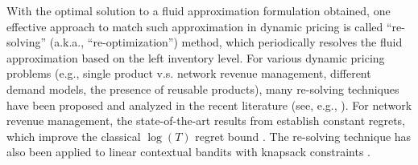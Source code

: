 \documentclass[opre]{informs3aa}
\begin{document}



With the optimal solution to a fluid approximation formulation obtained,
one effective approach to match such approximation in dynamic pricing is called ``re-solving'' (a.k.a., ``re-optimization'') method, which periodically resolves the fluid approximation based on the left inventory level. For various dynamic pricing problems (e.g., single product v.s. network revenue management, different demand models, the presence of reusable products), many re-solving techniques have been proposed and analyzed in the recent literature (see, e.g., \cite{jasin2014reoptimization, chen2015real,chen2019nonparametric,lei2020real,Wang2020resolve,Wang2020constant,lei2018randomized,maglaras2006dynamic,cooper2002asymptotic,reiman2008asymptotically,secomandi2008analysis,vera2021online}). For network revenue management, the state-of-the-art results from \cite{Wang2020resolve, Wang2020constant} establish constant regrets, which improve the classical $\log(T)$ regret bound \citep{jasin2014reoptimization}. The re-solving technique has also been applied to linear contextual bandits with knapsack constraints \citep{Xu21reopt}. 
\end{document}
